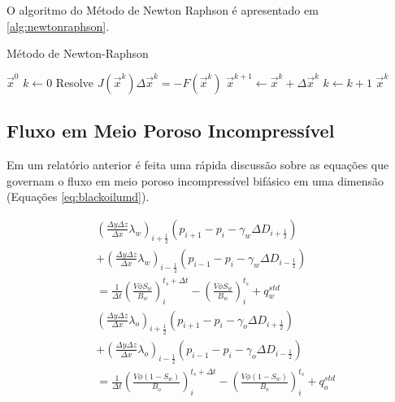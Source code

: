 \documentclass[final,5p]{elsarticle}
\numberwithin{equation}{section}
\begin{document}
        O algoritmo do Método de Newton Raphson é apresentado em \ref{alg:newtonraphson}.

        \begin{algorithm}
            \caption{Método de Newton-Raphson}\label{alg:newtonraphson}
            \begin{algorithmic}
                \Require $\vec{x}^0$
                \State $k \gets 0$
                \Repeat
                    \State Resolve $J(\vec{x}^k) \Delta \vec{x}^{k} = -F(\vec{x}^k)$
                    \State $\vec{x}^{k+1} \gets \vec{x}^{k} + \Delta \vec{x}^{k}$
                    \State $k \gets k+1$
                \State \Return $\vec{x}^{k}$
            \end{algorithmic}
        \end{algorithm}

    \subsection{Fluxo em Meio Poroso Incompressível}

        Em um relatório anterior\cite{relatoriogauss} é feita uma rápida discussão sobre as equações que governam o fluxo em meio poroso incompressível bifásico em uma dimensão (Equações \ref{eq:blackoilumd}).

        \begin{subequations}
        \begin{align}
            &\left( \frac{\Delta y \Delta z}{\Delta x} \lambda_w \right)_{i+\tfrac{1}{2}} (p_{i+1} - p_{i} - \gamma_w \Delta D_{i+\tfrac{1}{2}})  \nonumber \\
            &+ \left( \frac{\Delta y \Delta z}{\Delta x} \lambda_w \right)_{i-\tfrac{1}{2}} (p_{i-1} - p_{i} - \gamma_w \Delta D_{i-\tfrac{1}{2}}) \nonumber \\
            &  = \frac{1}{\Delta t} \left(\frac{V \phi S_w}{B_w}\right)_i^{t_s+\Delta t} - \left(\frac{V \phi S_w}{B_w}\right)_i^{t_s} + q^{std}_w \label{eq:blackoilumdw} \\
            &\left( \frac{\Delta y \Delta z}{\Delta x} \lambda_o \right)_{i+\tfrac{1}{2}} (p_{i+1} - p_{i} - \gamma_o \Delta D_{i+\tfrac{1}{2}})  \nonumber \\
            &+ \left( \frac{\Delta y \Delta z}{\Delta x} \lambda_o \right)_{i-\tfrac{1}{2}} (p_{i-1} - p_{i} - \gamma_o \Delta D_{i-\tfrac{1}{2}}) \nonumber \\
            &  = \frac{1}{\Delta t} \left(\frac{V \phi (1-S_w)}{B_o}\right)_i^{t_s+\Delta t} - \left(\frac{V \phi (1-S_w)}{B_o}\right)_i^{t_s} + q^{std}_o \label{eq:blackoilumdo}
        \end{align}
        \label{eq:blackoilumd}
        \end{subequations}
\end{document}
